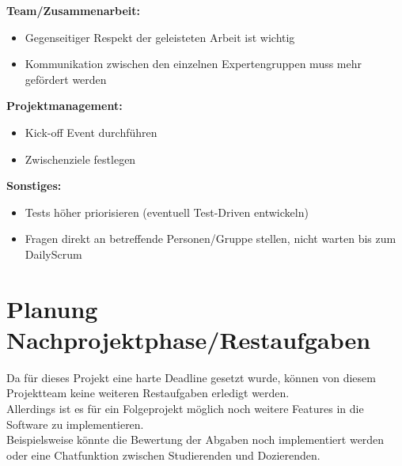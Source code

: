 \textbf{Team/Zusammenarbeit:}\\
\begin{itemize}
\item Gegenseitiger Respekt der geleisteten Arbeit ist wichtig 
\item Kommunikation zwischen den einzelnen Expertengruppen muss mehr gefördert werden
\end{itemize}

\textbf{Projektmanagement:}
\begin{itemize}
\item Kick-off Event durchführen
\item Zwischenziele festlegen
\end{itemize}

\textbf{Sonstiges:}\\
\begin{itemize}
\item Tests höher priorisieren (eventuell Test-Driven entwickeln)
\item Fragen direkt an betreffende Personen/Gruppe stellen, nicht warten bis zum DailyScrum
\end{itemize}

\section{Planung Nachprojektphase/Restaufgaben}

Da für dieses Projekt eine harte Deadline gesetzt wurde, können von diesem Projektteam keine weiteren Restaufgaben erledigt werden. \\
Allerdings ist es für ein Folgeprojekt möglich noch weitere Features in die Software zu implementieren. \\
Beispielsweise könnte die Bewertung der Abgaben noch implementiert werden oder eine Chatfunktion zwischen Studierenden und Dozierenden.